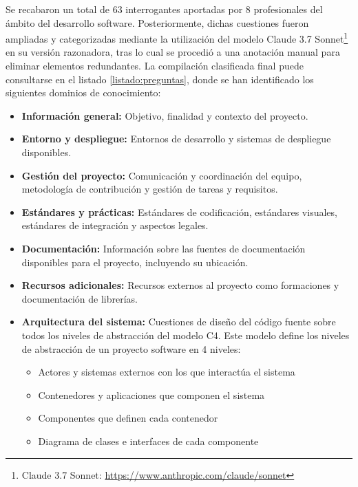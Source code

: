 Se recabaron un total de 63 interrogantes aportadas por 8 profesionales del ámbito del desarrollo software. Posteriormente, dichas cuestiones fueron ampliadas y categorizadas mediante la utilización del modelo Claude 3.7 Sonnet\footnote{Claude 3.7 Sonnet: \url{https://www.anthropic.com/claude/sonnet}} en su versión razonadora, tras lo cual se procedió a una anotación manual para eliminar elementos redundantes. La compilación clasificada final puede consultarse en el listado \ref{listado:preguntas}, donde se han identificado los siguientes dominios de conocimiento:


\begin{itemize}
\item\textbf{Información general: }Objetivo, finalidad y contexto del proyecto.
\item\textbf{Entorno y despliegue: }Entornos de desarrollo y sistemas de despliegue disponibles.
\item\textbf{Gestión del proyecto: }Comunicación y coordinación del equipo, metodología de contribución y gestión de tareas y requisitos.
\item\textbf{Estándares y prácticas: }Estándares de codificación, estándares visuales, estándares de integración y aspectos legales.
\item\textbf{Documentación: }Información sobre las fuentes de documentación disponibles para el proyecto, incluyendo su ubicación.
\item\textbf{Recursos adicionales: }Recursos externos al proyecto como formaciones y documentación de librerías.
\item\textbf{Arquitectura del sistema: }Cuestiones de diseño del código fuente sobre todos los niveles de abstracción del modelo C4\cite{noauthor_c4_nodate}. Este modelo define los niveles de abstracción de un proyecto software en 4 niveles:
\begin{itemize}
\item Actores y sistemas externos con los que interactúa el sistema
\item Contenedores y aplicaciones que componen el sistema
\item Componentes que definen cada contenedor
\item Diagrama de clases e interfaces de cada componente
\end{itemize}
\end{itemize}

